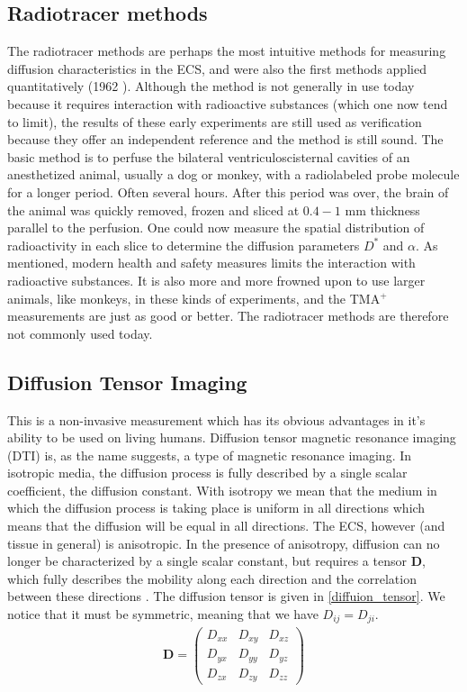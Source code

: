 \documentclass[a4paper,english, 12pt, twoside]{article}
\begin{document}
\subsection{Radiotracer methods}
The radiotracer methods are perhaps the most intuitive methods for measuring diffusion characteristics in the ECS, and were also the first methods applied quantitatively (1962 \cite{}). 
Although the method is not generally in use today because it requires interaction with radioactive substances (which one now tend to limit), the results of these early experiments are still used as verification because they offer an independent reference and the method is still sound. 
The basic method is to perfuse the bilateral ventriculoscisternal cavities of an anesthetized animal, usually a dog or monkey, with a radiolabeled probe molecule for a longer period. Often several hours. 
After this period was over, the brain of the animal was quickly removed, frozen and sliced at $0.4-1$ mm thickness parallel to the perfusion. 
One could now measure the spatial distribution of radioactivity in each slice to determine the diffusion parameters $D^*$ and $\alpha$. 
As mentioned, modern health and safety measures limits the interaction with radioactive substances. 
It is also more and more frowned upon to use larger animals, like monkeys, in these kinds of experiments, and the TMA$^+$ measurements are just as good or better. 
The radiotracer methods are therefore not commonly used today.

\subsection{Diffusion Tensor Imaging}
This is a non-invasive measurement which has its obvious advantages in it's ability to be used on living humans. 
Diffusion tensor magnetic resonance imaging (DTI) is, as the name suggests, a type of magnetic resonance imaging. 
In isotropic media, the diffusion process is fully described by a single scalar coefficient, the diffusion constant. 
With isotropy we mean that the medium in which the diffusion process is taking place is uniform in all directions which means that the diffusion will be equal in all directions. 
The ECS, however (and tissue in general) is anisotropic. 
In the presence of anisotropy, diffusion can no longer be characterized by a single scalar constant, but requires a tensor $\mathbf{D}$, which fully describes the mobility along each direction and the correlation between these directions \cite{le2001diffusion}. 
The diffusion tensor is given in \ref{diffuion_tensor}. We notice that it must be symmetric, meaning that we have $D_{ij} = D_{ji}$.
\begin{align}\label{diffuion_tensor}
 \mathbf{D} = \left(\begin{array}{ccc}
                     D_{xx} & D_{xy} & D_{xz}\\
                     D_{yx} & D_{yy} & D_{yz}\\
                     D_{zx} & D_{zy} & D_{zz}
                    \end{array}\right)
\end{align}
\end{document}
